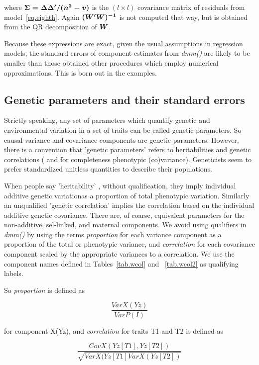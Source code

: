 \documentclass[titlepage]{article}  %
\begin{document}
where $\mbox{\boldmath $\Sigma = \Delta \Delta^{\prime}/(n^{2}-v)$}$ is the $(l \times l)$ covariance matrix of residuals from model~\ref{eq.eighth}. Again $\mbox{\boldmath $(W^{\prime}W)^{-1}$}$ is not computed that way, but is obtained from the QR decomposition of $\mbox{\boldmath $W$}$. 

Because these expressions are exact, given the usual assumptions in regression models, the standard errors of component estimates from {\em dmm()} are likely to be smaller than those obtained other procedures which employ numerical approximations. This is born out in the examples.

\clearpage
\subsection{Genetic parameters and their standard errors}
Strictly speaking, any set of parameters which quantify genetic and environmental variation in a set of traits can be called genetic parameters. So causal variance and covariance components are genetic parameters. However, there is a convention that 'genetic parameters' refers to heritabilities and genetic correlations ( and for completeness phenotypic (co)variance). Geneticists seem to prefer standardized unitless quantities to describe their populations.
 
 When people say 'heritability' , without qualification, they imply individual additive genetic variationas a proportion of total phenotypic variation. Similarly an unqualified 'genetic correlation' implies the correlation based on the individual additive genetic covariance. There are, of coarse, equivalent parameters for the non-additive, sel-linked, and maternal components. We avoid using qualifiers in {\em dmm()} by using the terms {\em proportion} for each variance component as a proportion of the total or phenotypic variance, and {\em correlation} for each covariance component scaled by the appropriate variances to a correlation. We use the component names defined in Tables~\ref{tab.wcol} and ~\ref{tab.wcol2} as qualifying labels.

So {\em proportion} is defined as 

\begin{displaymath}
\frac{VarX(Yz)}{VarP(I)}
\end{displaymath}

for component X(Yz), and {\em correlation} for traits T1 and T2  is defined as

\begin{displaymath}
\frac{CovX(Yz[T1],Yz[T2])}{\sqrt{VarX(Yz[T1] VarX(Yz[T2])}}
\end{displaymath}
\end{document}
